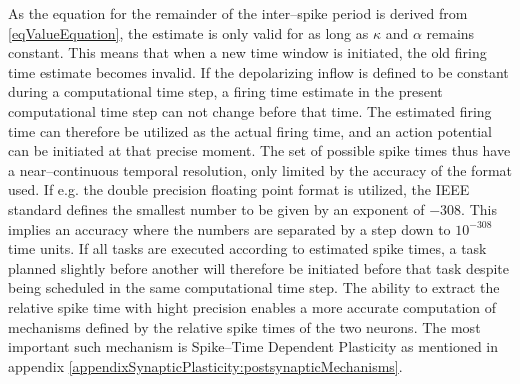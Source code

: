 	As the equation for the remainder of the inter--spike period is derived from \eqref{eqValueEquation}, the estimate is only valid for as long as $\kappa$ and $\alpha$ remains constant.
	This means that when a new time window is initiated, the old firing time estimate becomes invalid.
	If the depolarizing inflow is defined to be constant during a computational time step, a firing time estimate in the present computational time step can not change before that time. %
	The estimated firing time can therefore be utilized as the actual firing time, and an action potential can be initiated at that precise moment.
	The set of possible spike times thus have a near--continuous temporal resolution, only limited by the accuracy of the format used. %
	If e.g. the double precision floating point format is utilized, the IEEE standard defines the smallest number to be given by an exponent of $-308$\cite{kreyszig8edKAP17}. 
	This implies an accuracy where the numbers are separated by a step down to $10^{-308}$ time units.
	If all tasks are executed according to estimated spike times, a task planned slightly before another will therefore be initiated before that task despite being scheduled in the same computational time step.
	The ability to extract the relative spike time with hight precision enables a more accurate computation of mechanisms defined by the relative spike times of the two neurons.
	The most important such mechanism is Spike--Time Dependent Plasticity as mentioned in appendix \ref{appendixSynapticPlasticity:postsynapticMechanisms}.

